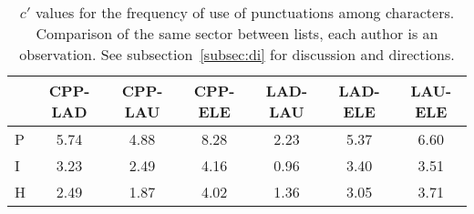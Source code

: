 \begin{table}
  \centering
  \caption{$c'$ values for the frequency of use of punctuations among characters. Comparison of the same sector between lists, each author is an observation. See subsection~\ref{subsec:di} for discussion and directions.}
    \small
  \begin{tabular}{l| c c c c c c}
 & CPP-LAD & CPP-LAU & CPP-ELE & LAD-LAU & LAD-ELE & LAU-ELE \\\hline
P & 5.74 & 4.88 & 8.28 & 2.23 & 5.37 & 6.60 \\
I & 3.23 & 2.49 & 4.16 & 0.96 & 3.40 & 3.51 \\
H & 2.49 & 1.87 & 4.02 & 1.36 & 3.05 & 3.71 \\
  \end{tabular}
  \label{tab:kolPctInter}
\end{table}
 
